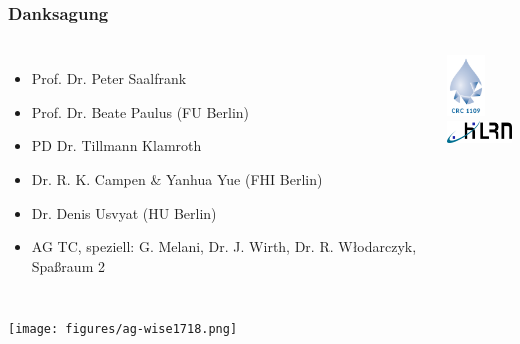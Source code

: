\documentclass[hyperref={pdfpagelabels=false}]{beamer}
\begin{document}
\begin{frame}
 \frametitle{Danksagung}
 \begin{columns}
 \begin{itemize}
  \item Prof. Dr. Peter Saalfrank
  \item Prof. Dr. Beate Paulus (FU Berlin)
  \item PD Dr. Tillmann Klamroth
  \item Dr. R. K. Campen \& Yanhua Yue (FHI Berlin)
  \item Dr. Denis Usvyat (HU Berlin)
  \item AG TC, speziell: G. Melani, Dr. J. Wirth, Dr. R. W\l{}odarczyk, Spa\ss{}raum 2
 \end{itemize}
 \centering
\includegraphics[width=1cm]{figures/crc1109.png}
\\
\includegraphics[width=2cm]{figures/hlrn_logo.png}
\end{columns}
\centering
\texttt{[image: figures/ag-wise1718.png]}

\end{frame}
\end{document}
